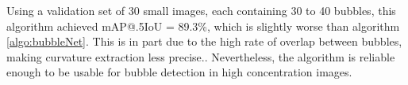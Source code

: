 				Using a validation set of 30 small images, each containing 30 to 40 bubbles, this algorithm achieved mAP@.5IoU = 89.3\%, which is slightly worse than algorithm \ref{algo:bubbleNet}. This is in part due to the high rate of overlap between bubbles, making curvature extraction less precise.. Nevertheless, the algorithm is reliable enough to be usable for bubble detection in high concentration images.					
				
				
				
				
				
				
				
				
				
				
				